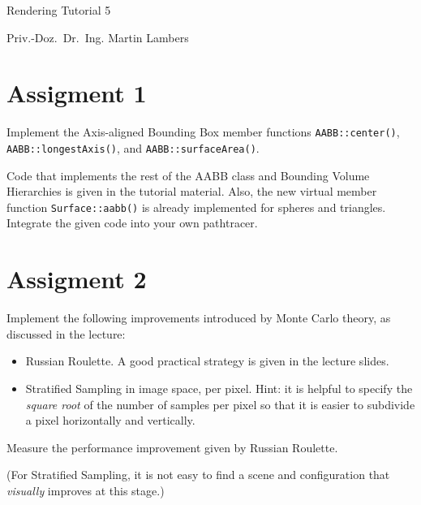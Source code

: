 \documentclass[a4paper,11pt]{article}
\newcommand{\authortitle}{Priv.-Doz.~Dr.~Ing.}
\newcommand{\authorname}{Martin Lambers}
\newcommand{\course}{Rendering}
\newcommand{\tutorial}{Tutorial 5}
\newcommand{\code}[1]{\texttt{#1}}
\begin{document}
\thispagestyle{empty}

\LARGE

\centerline{\course{} \tutorial}

\vspace{1ex}

\normalsize

\centerline{\authortitle{} \authorname}


\section*{Assigment 1}

Implement the Axis-aligned Bounding Box member functions \code{AABB::center()},
\code{AABB::longestAxis()}, and \code{AABB::surfaceArea()}.

Code that implements the rest of the AABB class and Bounding Volume Hierarchies
is given in the tutorial material. Also, the new virtual member function
\code{Surface::aabb()} is already implemented for spheres and triangles.
Integrate the given code into your own pathtracer.

\section*{Assigment 2}

Implement the following improvements introduced by Monte Carlo theory, as
discussed in the lecture:
\begin{itemize}
\item Russian Roulette. A good practical strategy is given in the lecture
slides.
\item Stratified Sampling in image space, per pixel. Hint: it is helpful to
specify the \emph{square root} of the number of samples per pixel so that it is
easier to subdivide a pixel horizontally and vertically.
\end{itemize}

Measure the performance improvement given by Russian Roulette.

(For Stratified Sampling, it is not easy to find a scene and configuration that
\emph{visually} improves at this stage.)
\end{document}
